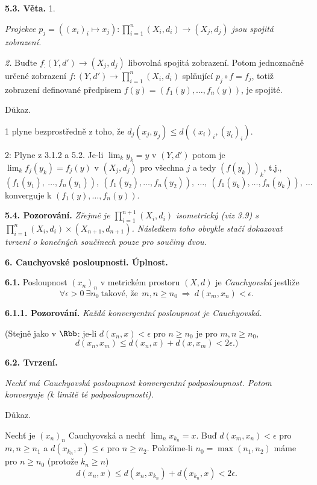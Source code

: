 \documentclass[12pt]{article}
\begin{document}
{ \bigskip
 
 {\bf 5.3. Věta.} 1. {\em Projekce $p_j=((x_i)_i\mapsto x_j):\prod_{i=1}^n (X_i,d_i)\to (X_j,d_j)$ jsou spojitá zobrazení.
 
 {\em 2.} Buďte $f_:(Y,d')\to (X_j,d_j)$ libovolná spojitá zobrazení. Potom jednoznačně určené zobrazení
 $f:(Y,d')\to\prod_{i=1}^n (X_i,d_i)$ splňující $p_j\circ f=f_j$, totiž zobrazení definované předpisem
 $f(y)=(f_1(y),\dots,f_n(y))$, je spojité.
 
 Důkaz.} 1 plyne bezprostředně z toho, že $d_j(x_j,y_j)\leq d((x_i)_i,(y_i)_i)$.
 
 2: Plyne z  3.1.2 a 5.2. Je-li $\lim_k y_k=y$ v $(Y,d')$ potom je $\lim_k f_j(y_k)=f_j(y)$ v $(X_j,d_j)$ pro všechna $j$ a tedy $(f(y_k))_k$, t.j.,
 $$
 (f_1(y_1),\ \dots,f_n(y_1)),\ (f_1(y_2),\dots,f_n(y_2)),\ \dots,\ (f_1(y_k),\dots,f_n(y_k)),\ \dots
 $$
  konverguje k  $(f_1(y),\dots,f_n(y))$. \sq
  
  \bigskip
 
 {\bf 5.4. Pozorování.} {\em Zřejmě je  $\prod_{i=1}^{n+1}(X_i,d_i)$
 isometrický (viz 3.9) s $\prod_{i=1}^{n}(X_i,d_i)\times (X_{n+1},d_{n+1})$. Následkem toho obvykle stačí dokazovat tvrzení o konečných součinech pouze pro součiny dvou.}
  
  
  
  \vskip10mm
 
 {\large\bf 6. Cauchyovské posloupnosti.  Úplnost.}
  
 \bigskip
 
 
 {\bf 6.1.} Posloupnost $(x_n)_n$ v metrickém prostoru $(X,d)$ je {\em Cauchyovská} jestliže
 $$
 \forall\epsilon>0\ \exists  n_0 \ \text{takové, že}\ \ m,n \geq n_0\ \Rightarrow\ d(x_m,x_n)<\epsilon.
$$
  
\medskip

{\bf 6.1.1. Pozorování.} {\em Každá konvergentní posloupnost je Cauchyovská.}

(Stejně jako v $\Rbb$: je-li $d(x_n,x)<\epsilon$ pro $n\geq n_0$ je pro $m,n\geq n_0$,
 $$
 d(x_n,x_m) \leq d(x_n,x)+d(x,x_m)<2\epsilon.)
 $$
  
 \bigskip
 
 {\bf 6.2. Tvrzení.} {\em Nechť má Cauchyovská posloupnost konvergentní podposloupnost. Potom konverguje
 (k limitě té podposloupnosti).
 
 Důkaz.} Nechť je $(x_n)_n$ Cauchyovská a nechť $\lim_n x_{k_n}=x$. Buď $d(x_m,x_n)<\epsilon$ pro $m,n \geq n_1$ a $d(x_{k_n},x)\leq\epsilon$ pro $n\geq n_2$. Položíme-li $n_0=\max(n_1,n_2)$ máme pro $n\geq n_0$ (protože $k_n\geq n$)
 $$
 d(x_n,x)\leq  d(x_n,x_{k_n})+d(x_{k_n},x)<2\epsilon.
 $$\sq
 
}
\end{document}
